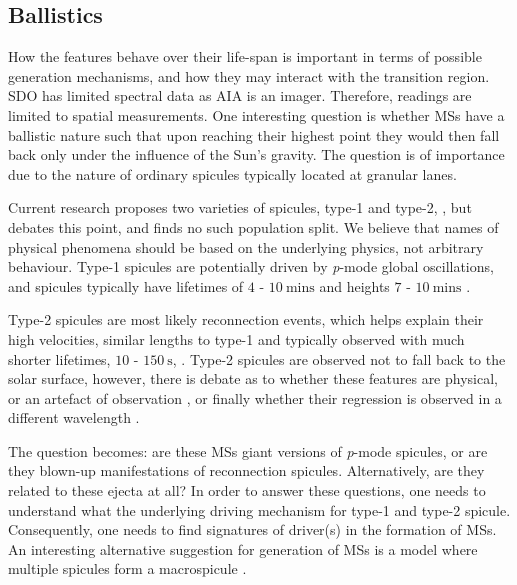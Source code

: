 \subsection{Ballistics}
How the features behave over their life-span is important in terms of possible generation mechanisms, and how they may interact with the transition region. SDO has limited spectral data as AIA is an imager. Therefore, readings are limited to spatial measurements. One interesting question is whether MSs have a ballistic nature such that upon reaching their highest point they would then fall back only under the influence of the Sun's gravity. The question is of importance due to the nature of ordinary spicules typically located at granular lanes.

Current research proposes two varieties of spicules, type-1 and type-2, \cite{Pereira2012}, but \cite{Zhang2012} debates this point, and finds no such population split. We believe that names of physical phenomena should be based on the underlying physics, not arbitrary behaviour. Type-1 spicules are potentially driven by \emph{p}-mode global oscillations, and spicules typically have lifetimes of $4$ - $10\ \textrm{mins}$ and heights $7$ - $10\ \textrm{mins}$ \cite{DePointeu2004}.

Type-2 spicules are most likely reconnection events, which helps explain their high velocities, similar lengths to type-1 and typically observed with much shorter lifetimes, $10$ - $150\ \textrm{s}$, \cite{Isobe2008}. Type-2 spicules are observed not to fall back to the solar surface, however, there is debate as to whether these features are physical, or an artefact of observation \cite{Tsiropoula2012}, \cite{Sekse2013} or finally whether their regression is observed in a different wavelength \cite{Pereira2014}.

The question becomes: are these MSs giant versions of \emph{p}-mode spicules, or are they blown-up manifestations of reconnection spicules. Alternatively, are they related to these ejecta at all? In order to answer these questions, one needs to understand what the underlying driving mechanism for type-1 and type-2 spicule. Consequently, one needs to find signatures of driver(s) in the formation of MSs. An interesting alternative suggestion for generation of MSs is a model where multiple spicules form a macrospicule \cite{Xia2005}.

